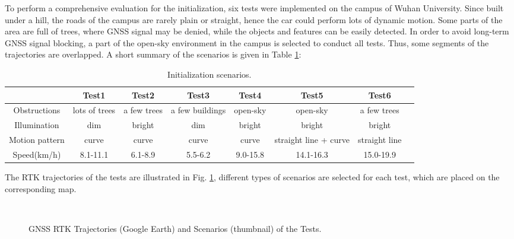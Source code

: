 \documentclass[journal,article,submit,moreauthors,pdftex]{Definitions/mdpi}
\begin{document}
To perform a comprehensive evaluation for the initialization, six tests 
were implemented on the campus of Wuhan University.
Since built under a hill, the roads of the campus are rarely plain or 
straight, hence the car could perform lots of dynamic motion.
Some parts of the area are full of trees, where GNSS signal may 
be denied, while the objects and features can be easily detected. 
In order to avoid long-term GNSS signal blocking, a part of the open-sky 
environment in the campus is selected to conduct all tests.
Thus, some segments of the trajectories are overlapped. 
A short summary of the scenarios is given in Table \ref{InitScenes}:
\begin{table}[H]
	\caption{Initialization scenarios.}
	\centering
	\begin{tabular}{cccccccc}
		\toprule
		               & Test1         & Test2       & Test3           & Test4    & Test5                 & Test6         \\
		\midrule
		Obstructions   & lots of trees & a few trees & a few buildings & open-sky & open-sky              & a few trees   \\
		Illumination   & dim           & bright      & dim             & bright   & bright                & bright        \\
		Motion pattern & curve         & curve       & curve           & curve    & straight line + curve & straight line \\
		Speed(km/h)    & 8.1-11.1      & 6.1-8.9     & 5.5-6.2         & 9.0-15.8 & 14.1-16.3             & 15.0-19.9     \\
		\bottomrule
	\end{tabular}
	\label{InitScenes}
\end{table}

The RTK trajectories of the tests are illustrated in Fig. \ref{Trajs},
different types of scenarios are selected for each test, which are 
placed on the corresponding map. 
\begin{figure}[H]
	\centering
	\\
	\caption{ GNSS RTK Trajectories (Google Earth) and Scenarios (thumbnail) of the Tests.}
	\label{Trajs}
\end{figure}
\end{document}
